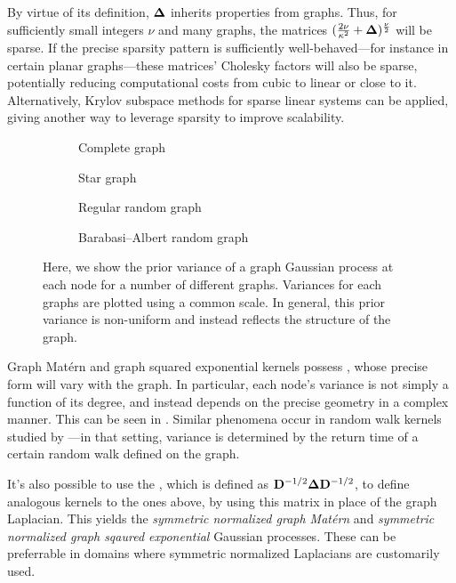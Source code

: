 \documentclass[11pt]{book}
\begin{document}
By virtue of its definition, $\m\lap$ inherits  properties from graphs.
Thus, for sufficiently small integers $\nu$ and many graphs, the matrices $(\frac{2 \nu}{\kappa^2} + \m\Delta)^{\frac{\nu}{2}}$ will be sparse.
If the precise sparsity pattern is sufficiently well-behaved---for instance in certain planar graphs---these matrices' Cholesky factors will also be sparse, potentially reducing computational costs from cubic to linear or close to it.
Alternatively, Krylov subspace methods for sparse linear systems can be applied, giving another way to leverage sparsity to improve scalability.

\begin{figure}
\begin{subfigure}{0.49\textwidth}

\caption{Complete graph}
\end{subfigure}
\begin{subfigure}{0.49\textwidth}

\caption{Star graph}
\end{subfigure}
\begin{subfigure}{0.49\textwidth}

\caption{Regular random graph}
\end{subfigure}
\begin{subfigure}{0.49\textwidth}

\caption{Barabasi--Albert random graph}
\end{subfigure}
\caption{Here, we show the prior variance of a graph Gaussian process at each node for a number of different graphs. Variances for each graphs are plotted using a common scale. In general, this prior variance is non-uniform and instead reflects the structure of the graph.}
\label{fig:graph-variance}
\end{figure}

Graph Matérn and graph squared exponential kernels possess , whose precise form will vary with the graph.
In particular, each node's variance is not simply a function of its degree, and instead depends on the precise geometry in a complex manner.
This can be seen in .
Similar phenomena occur in random walk kernels studied by \textcite{urry13}---in that setting, variance is determined by the return time of a certain random walk defined on the graph.

It's also possible to use the , which is defined as $\m{D}^{-1/2}\m\lap\m{D}^{-1/2}$, to define analogous kernels to the ones above, by using this matrix in place of the graph Laplacian.
This yields the \emph{symmetric normalized graph Matérn} and \emph{symmetric normalized graph sqaured exponential} Gaussian processes.
These can be preferrable in domains where symmetric normalized Laplacians are customarily used.
\end{document}
